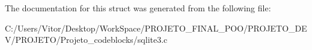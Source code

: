 The documentation for this struct was generated from the following file\-:\begin{DoxyCompactItemize}
\item 
C\-:/\-Users/\-Vitor/\-Desktop/\-Work\-Space/\-P\-R\-O\-J\-E\-T\-O\-\_\-\-F\-I\-N\-A\-L\-\_\-\-P\-O\-O/\-P\-R\-O\-J\-E\-T\-O\-\_\-\-D\-E\-V/\-P\-R\-O\-J\-E\-T\-O/\-Projeto\-\_\-codeblocks/sqlite3.\-c\end{DoxyCompactItemize}
